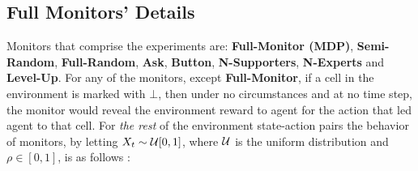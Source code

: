 \subsection{Full Monitors' Details}
\label{appendix:monitor_details}
Monitors that comprise the experiments are: \textbf{Full-Monitor (MDP)}, \textbf{Semi-Random}, \textbf{Full-Random}, \textbf{Ask}, \textbf{Button}, \textbf{N-Supporters}, \textbf{N-Experts} and \textbf{Level-Up}. For any of the monitors, except \textbf{Full-Monitor}, if a cell in the environment is marked with $\bot$, then under no circumstances and at no time step, the monitor would reveal the environment reward to agent for the action that led agent to that cell. For \emph{the rest} of the environment state-action pairs the behavior of monitors, by letting $X_t \sim \mathcal{U}[0, 1]$, where $\mathcal{U}$ is the uniform distribution and $\rho \in [0, 1]$, is as follows :
%
%
%
